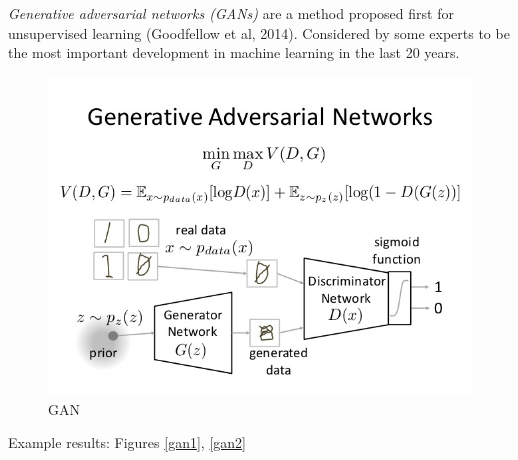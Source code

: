 \documentclass[english]{article}
\begin{document}
\benum
\item \emph{Generative adversarial networks (GANs)} are a method proposed first for unsupervised learning (Goodfellow et al, 2014). Considered by some experts to be the most important development in machine learning in the last 20 years. 
\begin{figure}
  \centering
  \includegraphics[scale=0.4]{gan.png}
    \caption{GAN}
    \label{gan}
\end{figure}

\item Example results: Figures \ref{gan1}, \ref{gan2}
\end{document}
